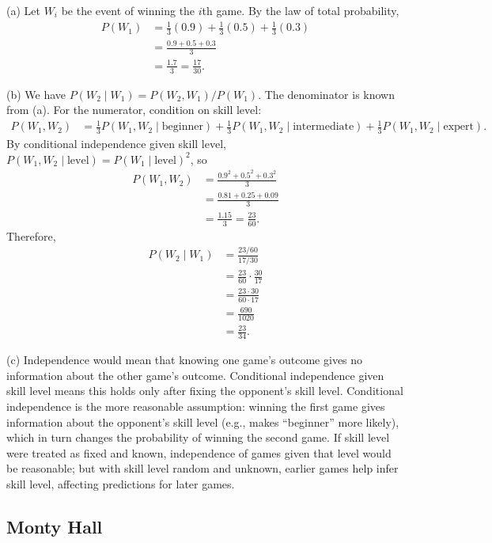 \documentclass[11pt]{article}
\begin{document}
(a) Let $W_i$ be the event of winning the $i$th game. By the law of total probability,
\begin{align*}
P(W_1) &= \frac{1}{3}(0.9) + \frac13(0.5) + \frac13(0.3) \\
&= \frac{0.9+0.5+0.3}{3} \\
&= \frac{1.7}{3} = \frac{17}{30}.
\end{align*}

(b) We have $P(W_2\mid W_1) = P(W_2,W_1)/P(W_1)$. The denominator is known from (a). For the numerator, condition on skill level:
\begin{align*}
P(W_1,W_2) &= \frac13 P(W_1,W_2\mid \text{beginner}) + \frac13 P(W_1,W_2\mid\text{intermediate}) + \frac13 P(W_1,W_2\mid\text{expert}).
\end{align*}
By conditional independence given skill level, $P(W_1,W_2\mid\text{level}) = P(W_1\mid\text{level})^2$, so
\begin{align*}
P(W_1,W_2) &= \frac{0.9^2 + 0.5^2 + 0.3^2}{3} \\
&= \frac{0.81 + 0.25 + 0.09}{3} \\
&= \frac{1.15}{3} = \frac{23}{60}.
\end{align*}
Therefore,
\begin{align*}
P(W_2\mid W_1) &= \frac{23/60}{17/30} \\
&= \frac{23}{60}\cdot\frac{30}{17} \\
&= \frac{23\cdot 30}{60\cdot 17} \\
&= \frac{690}{1020} \\
&= \frac{23}{34}.
\end{align*}

(c) Independence would mean that knowing one game's outcome gives no information about the other game's outcome. Conditional independence given skill level means this holds only after fixing the opponent's skill level. Conditional independence is the more reasonable assumption: winning the first game gives information about the opponent's skill level (e.g., makes ``beginner'' more likely), which in turn changes the probability of winning the second game. If skill level were treated as fixed and known, independence of games given that level would be reasonable; but with skill level random and unknown, earlier games help infer skill level, affecting predictions for later games.

\subsection{Monty Hall}
\end{document}
